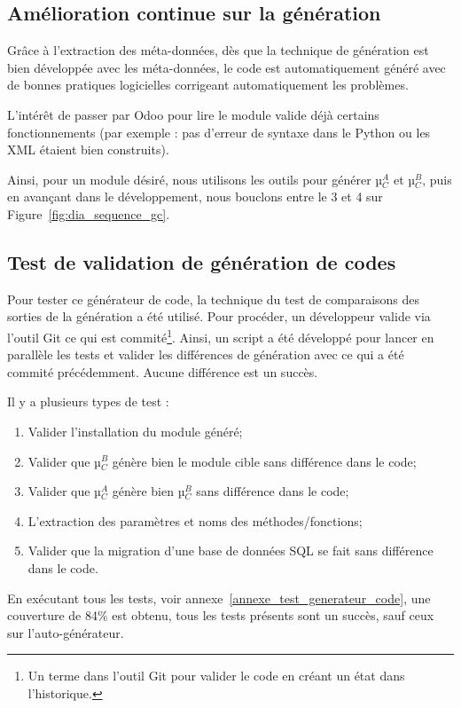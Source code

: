 \subsection {Amélioration continue sur la génération}

Grâce à l’extraction des méta-données, dès que la technique de génération est bien développée avec les méta-données, le code est automatiquement généré avec de bonnes pratiques logicielles corrigeant automatiquement les problèmes.

L’intérêt de passer par Odoo pour lire le module valide déjà certains fonctionnements (par exemple : pas d’erreur de syntaxe dans le Python ou les XML étaient bien construits).

Ainsi, pour un module désiré, nous utilisons les outils pour générer µ$_C^A$ et µ$_C^B$, puis en avançant dans le développement, nous bouclons entre le 3 et 4 sur Figure~\ref{fig:dia_sequence_gc}.

\subsection {Test de validation de génération de codes}\label{test_validation_generation_code_resultat}

Pour tester ce générateur de code, la technique du test de comparaisons des sorties de la génération a été utilisé. Pour procéder, un développeur valide via l'outil Git ce qui est commité\footnote{Un terme dans l'outil Git pour valider le code en créant un état dans l'historique.}. Ainsi, un script a été développé pour lancer en parallèle les tests et valider les différences de génération avec ce qui a été commité précédemment. Aucune différence est un succès.

Il y a plusieurs types de test : 
\begin{enumerate}
    \item Valider l’installation du module généré;
    \item Valider que µ$_C^B$ génère bien le module cible sans différence dans le code;
    \item Valider que µ$_C^A$ génère bien µ$_C^B$ sans différence dans le code;
    \item L’extraction des paramètres et noms des méthodes/fonctions;
    \item Valider que la migration d’une base de données SQL se fait sans différence dans le code.
\end{enumerate}

En exécutant tous les tests, voir annexe~\ref{annexe_test_generateur_code}, une couverture de 84\% est obtenu, tous les tests présents sont un succès, sauf ceux sur l’auto-générateur.

